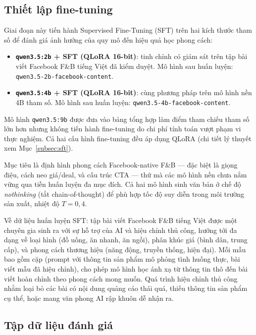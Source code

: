 \subsection{Thiết lập fine-tuning}

Giai đoạn này tiến hành Supervised Fine-Tuning (SFT) trên hai kích
thước tham số để đánh giá ảnh hưởng của quy mô đến hiệu quả học phong
cách:

\begin{itemize}
  \item \textbf{\texttt{qwen3.5:2b} + SFT (QLoRA 16-bit)}: tinh chỉnh
    có giám sát trên tập bài viết Facebook F\&B tiếng Việt đã kiểm
    duyệt. Mô hình sau huấn luyện:
    \texttt{qwen3.5-2b-facebook-content}.
  \item \textbf{\texttt{qwen3.5:4b} + SFT (QLoRA 16-bit)}: cùng phương
    pháp trên mô hình nền 4B tham số. Mô hình sau huấn luyện:
    \texttt{qwen3.5-4b-facebook-content}.
\end{itemize}

Mô hình \texttt{qwen3.5:9b} được đưa vào bảng tổng hợp làm điểm
tham chiếu tham số lớn hơn nhưng không tiến hành fine-tuning do chi
phí tính toán vượt phạm vi thực nghiệm. Cả hai cấu hình fine-tuning
đều áp dụng QLoRA  (chi tiết lý thuyết xem
Mục~\ref{subsec:sft}).

Mục tiêu là định hình phong cách Facebook-native F\&B --- đặc biệt
là giọng điệu, cách neo giá/deal, và cấu trúc CTA --- thứ mà các mô
hình nền chưa nắm vững qua tiền huấn luyện đa mục đích. Cả hai mô hình
sinh văn bản ở chế độ \emph{nothinking} (tắt chain-of-thought) để phù
hợp tốc độ suy diễn trong môi trường sản xuất, nhiệt độ $T = 0{,}4$.

Về dữ liệu huấn luyện SFT: tập bài viết Facebook F\&B tiếng Việt được
một chuyên gia sinh ra với sự hỗ trợ của AI và hiệu chỉnh thủ công, hướng
tới đa dạng về loại hình (đồ uống, ăn nhanh, ăn ngồi), phân khúc giá
(bình dân, trung cấp), và phong cách thương hiệu (năng động, truyền
thống, hiện đại). Mỗi mẫu bao gồm cặp (prompt với thông tin sản phẩm
mô phỏng tình huống thực, bài viết mẫu đã hiệu chỉnh), cho phép mô hình
học ánh xạ từ thông tin thô đến bài viết hoàn chỉnh theo phong cách
mong muốn. Quá trình hiệu chỉnh thủ công nhằm loại bỏ các bài có nội
dung quảng cáo thái quá, thiếu thông tin sản phẩm cụ thể, hoặc mang
văn phong AI rập khuôn dễ nhận ra.

\subsection{Tập dữ liệu đánh giá}

